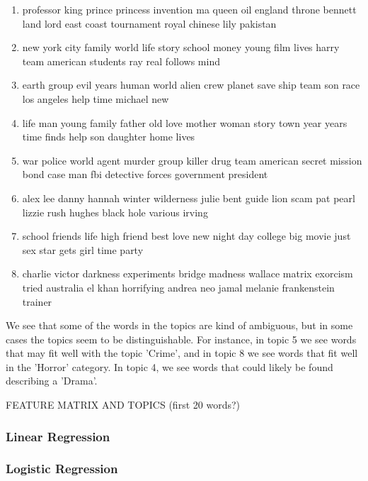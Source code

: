 \documentclass[11pt]{article}
\begin{document}
\begin{enumerate}
\item professor king prince princess invention ma queen oil england throne bennett land lord east coast tournament royal chinese lily pakistan

\item new york city family world life story school money young film lives harry team american students ray real follows mind

\item earth group evil years human world alien crew planet save ship team son race los angeles help time michael new

\item life man young family father old love mother woman story town year years time finds help son daughter home lives

\item war police world agent murder group killer drug team american secret mission bond case man fbi detective forces government president

\item alex lee danny hannah winter wilderness julie bent guide lion scam pat pearl lizzie rush hughes black hole various irving

\item school friends life high friend best love new night day college big movie just sex star gets girl time party

\item charlie victor darkness experiments bridge madness wallace matrix exorcism tried australia el khan horrifying andrea neo jamal melanie frankenstein trainer
\end{enumerate}

We see that some of the words in the topics are kind of ambiguous, but in some cases the topics seem to be distinguishable. For instance, in topic 5 we see words that may fit well with the topic 'Crime', and in topic 8 we see words that fit well in the 'Horror' category. In topic 4, we see words that could likely be found describing a 'Drama'.

FEATURE MATRIX AND TOPICS (first 20 words?)

\subsubsection{Linear Regression}

\subsubsection{Logistic Regression}
\end{document}
